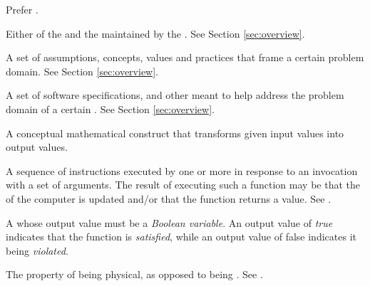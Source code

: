 {
Prefer .

Either of the  and the  maintained by the .
See Section \ref{sec:overview}.

A set of assumptions, concepts, values and practices that frame a certain problem domain.
See Section \ref{sec:overview}.

A set of software specifications,  and other  meant to help address the problem domain of a certain .
See Section \ref{sec:overview}.

A conceptual mathematical construct that transforms given input values into output values.


A sequence of instructions executed by one or more  in response to an invocation with a set of arguments.
The result of executing such a function may be that the  of the computer is updated and/or that the function returns a value.
See .

A  whose output value must be a \textit{Boolean variable}.
An output value of \textit{true} indicates that the function is \textit{satisfied}, while an output value of false indicates it being \textit{violated}.


The property of being physical, as opposed to being .
See .

}
